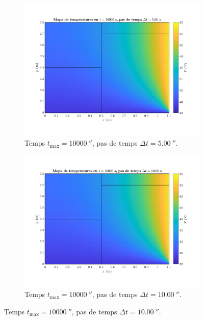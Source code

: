 \begin{figure}[ht]
\begin{subfigure}{.5\textwidth}
	\end{subfigure}
	\begin{subfigure}{.5\textwidth}
		\centering
		\includegraphics[width=.95\linewidth]{imagenes/04_influencia/pas_temps/pas_temps_15.pdf}
		\vspace{-15pt}
		\caption{Temps $t_\text{max} = 10000 \ \second$, pas de temps $\Delta t = 5.00 \ \second$.}
		\label{fig:pas_temps_15}
	\end{subfigure}%
	\begin{subfigure}{.5\textwidth}
		\centering
		\includegraphics[width=.95\linewidth]{imagenes/04_influencia/pas_temps/pas_temps_16.pdf}
		\vspace{-15pt}
		\caption{Temps $t_\text{max} = 10000 \ \second$, pas de temps $\Delta t = 10.00 \ \second$.}
		\label{fig:pas_temps_16}

\end{subfigure}
\end{figure}
